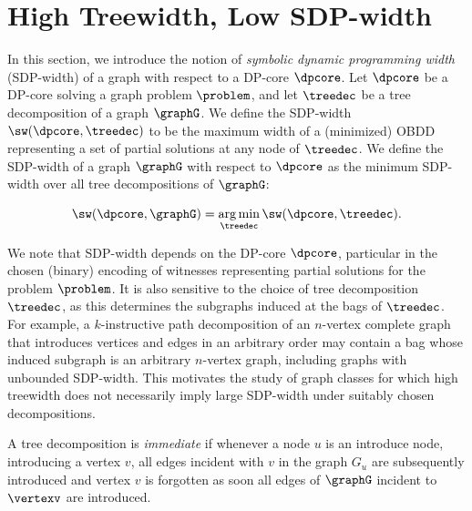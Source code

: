 \section{High Treewidth, Low SDP-width}\label{sec:HighTlowS}

In this section, we introduce the notion of \emph{symbolic dynamic programming
width} (SDP-width) of a graph with respect to a DP-core $\dpcore$. Let $\dpcore$
be a DP-core solving a graph problem $\problem$, and let $\treedec$ be a tree
decomposition of a graph $\graphG$. We define the SDP-width
$\sw(\dpcore,\treedec)$ to be the maximum width of a (minimized) OBDD representing
a set of partial solutions at any node of $\treedec$.
We define the SDP-width of a graph $\graphG$ with respect to $\dpcore$ as the
minimum SDP-width over all tree decompositions of $\graphG$:

$$\sw(\dpcore,\graphG)
= \argmin_{\treedec}\sw(\dpcore,\treedec).$$


We note that SDP-width depends on the DP-core $\dpcore$, particular in the
chosen (binary) encoding of witnesses representing partial solutions for the
problem $\problem$. It is also sensitive to the choice of tree decomposition
$\treedec$, as this determines the subgraphs induced at the bags of
$\treedec$. For example, a $k$-instructive path decomposition of an $n$-vertex
complete graph that introduces vertices and edges in an arbitrary order may
contain a bag whose induced subgraph is an arbitrary $n$-vertex graph, including
graphs with unbounded SDP-width. This motivates the study of graph classes for which high treewidth does not
necessarily imply large SDP-width under suitably chosen decompositions.

A tree decomposition is \emph{immediate} if whenever a node $u$ is an introduce node, introducing a vertex $v$, all edges incident with $v$ in the graph $G_u$ are subsequently introduced and vertex $v$ is forgotten as soon all edges of $\graphG$ incident to $\vertexv$ are introduced. 

